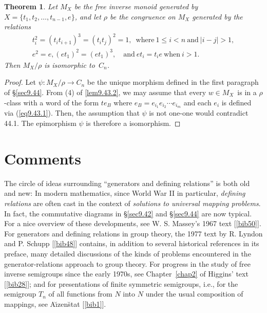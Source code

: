 \documentclass{surv-l}
\numberwithin{equation}{section}
\numberwithin{table}{section}
\numberwithin{figure}{section}
\theoremstyle{plain}
\newtheorem{theorem}[equation]{Theorem}
\theoremstyle{definition}
\begin{document}
\begin{theorem}\label{thm9.44.3}
Let $M_{X}$ be the free inverse monoid generated by $X = \{t_{1},
t_{2},\ldots, t_{n-1}, e\}$, and let $\rho$ be the congruence on
$M_{X}$ generated by the relations
\begin{gather*}
t_{i}^{2} =(t_{i}t_{i+1})^{3}=(t_{i}t_{j})^{2}=1,\enspace \text{where}\
1\leq i<n\ \text{and}\ |i-j|>1,\\
e^{2} =e, (et_{1})^{2}=(et_{1})^{3},\quad \text{and}\ et_{i}=t_{i}e\ \text{when}\ i>1.\quad
\end{gather*}
Then $M_{X}/\rho$ is isomorphic to~$C_{n}$.
\end{theorem}

\begin{proof} Let $\psi : M_{X}/\rho\rightarrow C_{n}$ be the unique
morphism defined in the first paragraph of \S\ref{sec9.44}. From
(4) of \ref{lem9.43.2}, we may assume that every $w\in M_{X}$~is
in a $\rho$-class with a word of the form $te_{B}$ where
$e_{B}=e_{i_{1}}e_{i_{2}}\cdots e_{i_{m}}$ and each $e_{i}$ is
defined via (\ref{eq9.43.1}). Then, the assumption that $\psi$ is
not one-one would contradict 44.1. The epimorphism $\psi$ is
therefore a isomorphism.
\end{proof}

\section{Comments}\label{sec9.45}

The circle of ideas surrounding ``generators and defining
relations'' is both old and new: In modern mathematics, since
World War II in particular, \emph{defining relations} are often
cast in the context of \emph{solutions to universal mapping
problems}. In fact, the commutative diagrams in \S\ref{sec9.42}
and \S\ref{sec9.44} are now typical. For a nice overview of these
developments, see W. S. Massey's\index{Massey, W.S.} 1967 text
[\ref{bib50}]. For generators and defining
relations in group theory, the 1977 text by R.
Lyndon and P. Schupp
[\ref{bib48}] contains, in addition to several
historical references in its preface, many detailed discussions of
the kinds of problems encountered in the generator-relations
approach to group theory. For progress in the study of free
inverse semigroups since the early 1970s, see Chapter~\ref{chap2}
of Higgins' text [\ref{bib28}]; and for
presentations of finite symmetric semigroups, i.e., for the
semigroup $T_{n}$ of all functions from $N$ into $N$ under the
usual composition of mappings, see A\u{\i}zen\u{s}tat [\ref{bib1}].
\end{document}
